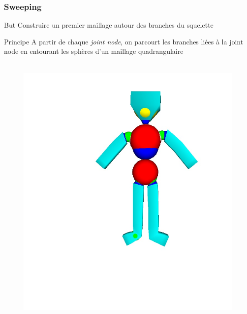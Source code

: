 \documentclass[9pt]{beamer}
\begin{document}
\begin{frame}
	\frametitle{Sweeping}
	\begin{block}{But}
		Construire un premier maillage autour des branches du squelette
	\end{block}
	\begin{block}{Principe}
		A partir de chaque \textit{joint node}, on parcourt les branches liées à la joint node en entourant les sphères d'un maillage quadrangulaire
	\end{block}
		\begin{figure}[H]
		\centering
		\leavevmode
  		\hbox{
  			\includegraphics[scale=0.25]{images/sweeping1.jpg}
  			\hspace*{0.5cm} 
}
\end{figure}
\end{frame}
\end{document}
